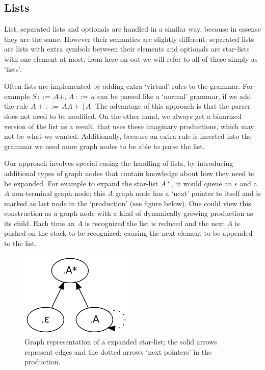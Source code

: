 \documentclass[a4paper,10pt]{article}
\begin{document}
\subsection{Lists}

List, separated lists and optionals are handled in a similar way, because in essense they are the same. However their semantics are slightly different; separated lists are lists with extra symbols between their elements and optionals are star-lists with one element at most; from here on out we will refer to all of these simply as `lists'.

Often lists are implemented by adding extra `virtual' rules to the grammar. For example $S\,::=\,A+,\,A\,::=\,a$ can be parsed like a `normal' grammar, if we add the rule $A+\,::=\,AA+\,|\,A$. The advantage of this approach is that the parser does not need to be modified. On the other hand, we always get a binarized version of the list as a result, that uses these imaginary productions, which may not be what we wanted. Additionally, because an extra rule is inserted into the grammar we need more graph nodes to be able to parse the list.

Our approach involves special casing the handling of lists, by introducing additional types of graph nodes that contain knowledge about how they need to be expanded. For example to expand the star-list $A*$, it would queue an $\epsilon$ and a $A$ non-terminal graph node; this $A$ graph node has a `next' pointer to itself and is marked as last node in the `production' (see figure below). One could view this construction as a graph node with a kind of dynamically growing production as its child. Each time an $A$ is recognized the list is reduced and the next $A$ is pushed on the stack to be recognized; causing the next element to be appended to the list.

\begin{figure}[H]
\centering
\includegraphics[scale=0.5]{star-list.png}
\caption{Graph representation of a expanded star-list; the solid arrows represent edges and the dotted arrows `next pointers' in the production.}
\end{figure}
\end{document}
